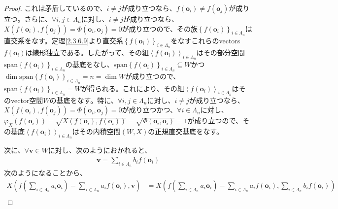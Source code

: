 \documentclass[dvipdfmx]{jsarticle}
\begin{document}
\begin{proof}
これは矛盾しているので、$i \neq j$が成り立つなら、$f\left( \mathbf{o}_{i} \right) \neq f\left( \mathbf{o}_{j} \right)$が成り立つ。さらに、$\forall i,j \in \varLambda_{n}$に対し、$i \neq j$が成り立つなら、$X\left( f\left( \mathbf{o}_{i} \right),f\left( \mathbf{o}_{j} \right) \right) = \varPhi \left( \mathbf{o}_{i},\mathbf{o}_{j} \right) = 0$が成り立つので、その族$\left\{ f\left( \mathbf{o}_{i} \right) \right\}_{i \in \varLambda_{n}}$は直交系をなす。定理\ref{2.3.6.9}より直交系$\left\{ f\left( \mathbf{o}_{i} \right) \right\}_{i \in \varLambda_{n}}$をなすこれらのvectors$f\left( \mathbf{o}_{i} \right)$は線形独立である。したがって、その組$\left\langle f\left( \mathbf{o}_{i} \right) \right\rangle_{i \in \varLambda_{n}}$はその部分空間$\mathrm{span}\left\{ f\left( \mathbf{o}_{i} \right) \right\}_{i \in \varLambda_{n}}$の基底をなし、$\mathrm{span}\left\{ f\left( \mathbf{o}_{i} \right) \right\}_{i \in \varLambda_{n}} \subseteq W$かつ$\dim{\mathrm{span}\left\{ f\left( \mathbf{o}_{i} \right) \right\}_{i \in \varLambda_{n}}} = n = \dim W$が成り立つので、$\mathrm{span}\left\{ f\left( \mathbf{o}_{i} \right) \right\}_{i \in \varLambda_{n}} = W$が得られる。これにより、その組$\left\langle f\left( \mathbf{o}_{i} \right) \right\rangle_{i \in \varLambda_{n}}$はそのvector空間$W$の基底をなす。特に、$\forall i,j \in \varLambda_{n}$に対し、$i \neq j$が成り立つなら、$X\left( f\left( \mathbf{o}_{i} \right),f\left( \mathbf{o}_{j} \right) \right) = \varPhi \left( \mathbf{o}_{i},\mathbf{o}_{j} \right) = 0$が成り立つかつ、$\forall i \in \varLambda_{n}$に対し、$\varphi_{X}\left( f\left( \mathbf{o}_{i} \right) \right) = \sqrt{X\left( f\left( \mathbf{o}_{i} \right),f\left( \mathbf{o}_{i} \right) \right)} = \sqrt{\varPhi \left( \mathbf{o}_{i},\mathbf{o}_{i} \right)} = 1$が成り立つので、その基底$\left\langle f\left( \mathbf{o}_{i} \right) \right\rangle_{i \in \varLambda_{n}}$はその内積空間$(W,X)$の正規直交基底をなす。\par
次に、$\forall\mathbf{v} \in W$に対し、次のようにおかれると、
\begin{align*}
\mathbf{v} = \sum_{i \in \varLambda_{n}} {b_{i}f\left( \mathbf{o}_{i} \right)}
\end{align*}
次のようになることから、
\begin{align*}
X\left( f\left( \sum_{i \in \varLambda_{n}} {a_{i}\mathbf{o}_{i}} \right) - \sum_{i \in \varLambda_{n}} {a_{i}f\left( \mathbf{o}_{i} \right)},\mathbf{v} \right) &= X\left( f\left( \sum_{i \in \varLambda_{n}} {a_{i}\mathbf{o}_{i}} \right) - \sum_{i \in \varLambda_{n}} {a_{i}f\left( \mathbf{o}_{i} \right)},\sum_{i \in \varLambda_{n}} {b_{i}f\left( \mathbf{o}_{i} \right)} \right)\\

\end{align*}
\end{proof}
\end{document}
